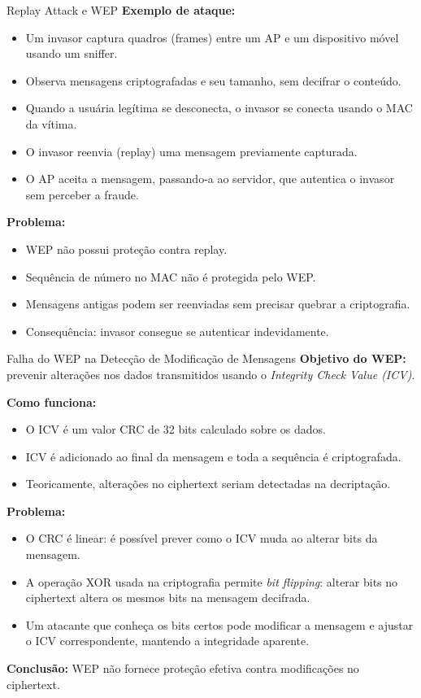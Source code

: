 \begin{frame}{Replay Attack e WEP}
    \textbf{Exemplo de ataque:}
    \begin{itemize}
        \item Um invasor captura quadros (frames) entre um AP e um dispositivo móvel usando um sniffer.
        \item Observa mensagens criptografadas e seu tamanho, sem decifrar o conteúdo.
        \item Quando a usuária legítima se desconecta, o invasor se conecta usando o MAC da vítima.
        \item O invasor reenvia (replay) uma mensagem previamente capturada.
        \item O AP aceita a mensagem, passando-a ao servidor, que autentica o invasor sem perceber a fraude.
    \end{itemize}

    \bigskip
    \textbf{Problema:}
    \begin{itemize}
        \item WEP não possui proteção contra replay.
        \item Sequência de número no MAC não é protegida pelo WEP.
        \item Mensagens antigas podem ser reenviadas sem precisar quebrar a criptografia.
        \item Consequência: invasor consegue se autenticar indevidamente.
    \end{itemize}
\end{frame}

\begin{frame}{Falha do WEP na Detecção de Modificação de Mensagens}
    \textbf{Objetivo do WEP:} prevenir alterações nos dados transmitidos usando o \textit{Integrity Check Value (ICV)}.

    \medskip
    \textbf{Como funciona:}
    \begin{itemize}
        \item O ICV é um valor CRC de 32 bits calculado sobre os dados.
        \item ICV é adicionado ao final da mensagem e toda a sequência é criptografada.
        \item Teoricamente, alterações no ciphertext seriam detectadas na decriptação.
    \end{itemize}

    \medskip
    \textbf{Problema:}
    \begin{itemize}
        \item O CRC é linear: é possível prever como o ICV muda ao alterar bits da mensagem.
        \item A operação XOR usada na criptografia permite \textit{bit flipping}: alterar bits no ciphertext altera os mesmos bits na mensagem decifrada.
        \item Um atacante que conheça os bits certos pode modificar a mensagem e ajustar o ICV correspondente, mantendo a integridade aparente.
    \end{itemize}

    \medskip
    \textbf{Conclusão:} WEP não fornece proteção efetiva contra modificações no ciphertext.
\end{frame}

